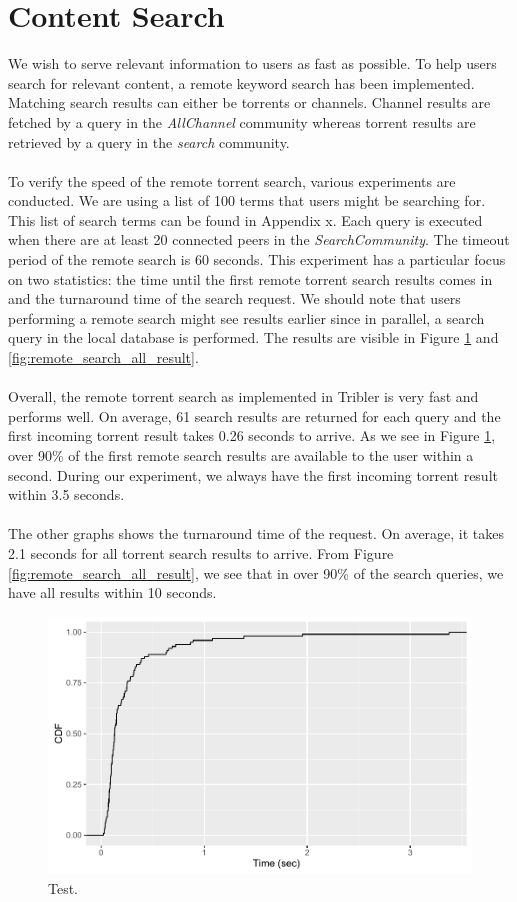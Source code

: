 \section{Content Search}
We wish to serve relevant information to users as fast as possible. To help users search for relevant content, a remote keyword search has been implemented. Matching search results can either be torrents or channels. Channel results are fetched by a query in the \emph{AllChannel} community whereas torrent results are retrieved by a query in the \emph{search} community.\\\\
To verify the speed of the remote torrent search, various experiments are conducted. We are using a list of 100 terms that users might be searching for. This list of search terms can be found in Appendix x. Each query is executed when there are at least 20 connected peers in the \emph{SearchCommunity}. The timeout period of the remote search is 60 seconds. This experiment has a particular focus on two statistics: the time until the first remote torrent search results comes in and the turnaround time of the search request. We should note that users performing a remote search might see results earlier since in parallel, a  search query in the local database is performed. The results are visible in Figure \ref{fig:remote_search_first_result} and \ref{fig:remote_search_all_result}.\\\\
Overall, the remote torrent search as implemented in Tribler is very fast and performs well. On average, 61 search results are returned for each query and the first incoming torrent result takes 0.26 seconds to arrive. As we see in Figure \ref{fig:remote_search_first_result}, over 90\% of the first remote search results are available to the user within a second. During our experiment, we always have the first incoming torrent result within 3.5 seconds.\\\\
The other graphs shows the turnaround time of the request. On average, it takes 2.1 seconds for all torrent search results to arrive. From Figure \ref{fig:remote_search_all_result}, we see that in over 90\% of the search queries, we have all results within 10 seconds.

\begin{figure}[!h]
	\centering
	\includegraphics[width=0.6\columnwidth]{images/experiments/cdf_remote_search_first_results}
	\caption{Test.}
	\label{fig:remote_search_first_result}
\end{figure}

